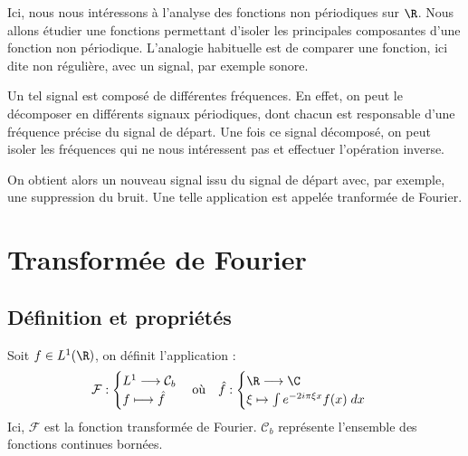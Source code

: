 
\minitoc  %

Ici, nous nous intéressons à l'analyse des fonctions non périodiques sur $\R$. 
Nous allons étudier une fonctions permettant d'isoler les principales composantes d'une fonction non périodique. 
L'analogie habituelle est de comparer une fonction, ici dite non régulière, avec un signal, par exemple sonore. 

Un tel signal est composé de différentes fréquences. En effet, on peut le décomposer en différents signaux 
périodiques, dont chacun est responsable d'une fréquence précise du signal de départ. 
Une fois ce signal décomposé, on peut isoler les fréquences qui ne nous intéressent pas et effectuer l'opération inverse. 

On obtient alors un nouveau signal issu du signal de départ avec, par exemple, une suppression du bruit. 
Une telle application est appelée tranformée de Fourier. 

\section{Transformée de Fourier}

\subsection{Définition et propriétés}

\begin{definition}
    Soit $f \in L^1(\R)$, on définit l'application :
        \[ \mathcal{F} : 
            \begin{cases}
                L^1 \longrightarrow \mathcal{C}_b \\
                f \longmapsto \hat{f} 
            \end{cases}
        \text{où} \quad 
        \hat{f} :
        \begin{cases}
            \R \longrightarrow \C \\
            \xi \mapsto \int e^{-2i\pi \xi x} f(x) \; dx 
        \end{cases}
        \]
    Ici, $\mathcal{F}$ est la fonction transformée de Fourier. $\mathcal{C}_b$ représente l'ensemble des fonctions continues bornées. 
\end{definition}

